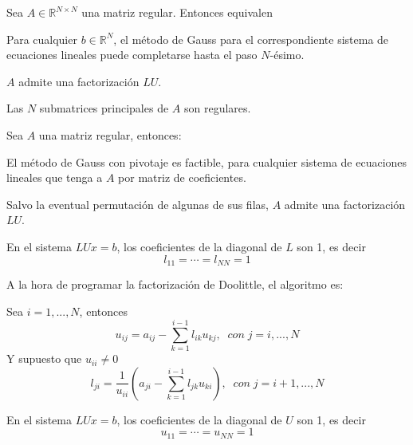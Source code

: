 \begin{nth}
Sea $A \in \mathbb{R}^{N \times N}$ una matriz regular. Entonces equivalen
	\begin{nlist}
	\item Para cualquier $b \in \mathbb{R}^N$, el método de Gauss para el correspondiente sistema de ecuaciones lineales puede completarse hasta el paso $N$-ésimo.
	\item $A$ admite una factorización $LU$.
	\item Las $N$ submatrices principales de $A$ son regulares.
	\end{nlist}
\end{nth}
			
\begin{nth}
Sea $A$ una matriz regular, entonces:
	\begin{nlist}
	\item El método de Gauss con pivotaje es factible, para cualquier sistema de ecuaciones lineales que tenga a $A$ por matriz de coeficientes.
	\item Salvo la eventual permutación de algunas de sus filas, $A$ admite una factorización $LU$.
	\end{nlist}
\end{nth}
			
\begin{ndef}
			En el sistema $LUx = b$, los coeficientes de la diagonal de $L$ son 1, es decir
\[ l_{11} = \cdots = l_{NN} = 1 \]
\end{ndef}
			
A la hora de programar la factorización de Doolittle, el algoritmo es:

Sea $i = 1,...,N$, entonces
\[ u_{ij} = a_{ij} - \sum_{k=1}^{i-1} l_{ik}u_{kj}, \; \; con \; j = i,...,N \]
Y supuesto que $u_{ii} \neq 0$
\[ l_{ji} = \frac{1}{u_{ii}} \left( a_{ji} - \sum_{k=1}^{i-1} l_{jk}u_{ki} \right), \; \; con \; j = i+1,...,N \]			
			
\begin{ndef}
En el sistema $LUx = b$, los coeficientes de la diagonal de $U$ son 1, es decir
\[ u_{11} = \cdots = u_{NN} = 1 \]
\end{ndef}

